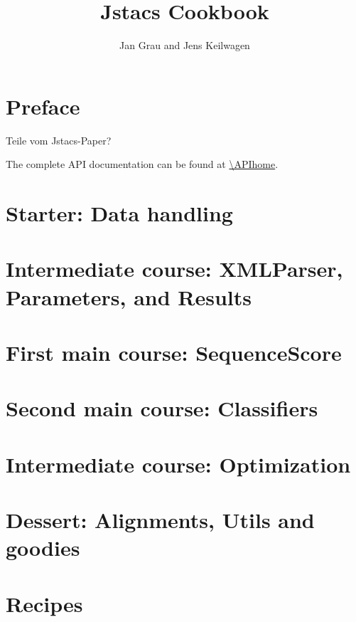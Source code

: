 \documentclass[a4paper]{report}
\author{Jan Grau and Jens Keilwagen}
\title{Jstacs Cookbook}
\begin{document}
\maketitle
\cleardoublepage

\tableofcontents
\clearpage

\section{Preface}

Teile vom Jstacs-Paper?

\vfill
The complete API documentation can be found at \url{\APIhome}.
\clearpage

\section{Starter: Data handling}\label{data}

\clearpage

\section{Intermediate course: XMLParser, Parameters, and Results}\label{sec:xmlparres}

\clearpage

\section{First main course: SequenceScore}\label{sequenceScore}

\clearpage

\section{Second main course: Classifiers}\label{classifier}

\clearpage

\section{Intermediate course: Optimization}\label{Optimization}

\clearpage

\section{Dessert: Alignments, Utils and goodies}

\clearpage

\section{Recipes}

\end{document}
